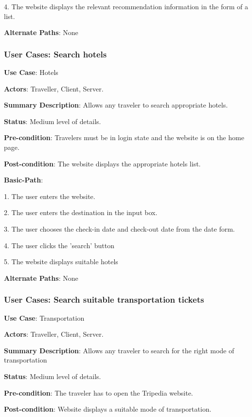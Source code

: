 \documentclass[conference]{IEEEtran}
\begin{document}
4. The website displays the relevant recommendation information in the form of a list.

\textbf{Alternate Paths}:  None

\subsubsection{User Cases: Search hotels}

\textbf{ }

\textbf{Use Case}: Hotels

\textbf{Actors}: Traveller, Client, Server.

\textbf{Summary Description}: Allows any traveler to search appropriate hotels.

\textbf{Status}: Medium level of details.

\textbf{Pre-condition}: Travelers must be in login state and the website is on the home page.

\textbf{Post-condition}: The website displays the appropriate hotels list.

\textbf{Basic-Path}:

1. The user enters the website.

2. The user enters the destination in the input box.

3. The user chooses the check-in date and check-out date from the date form.

4. The user clicks the 'search' button

5. The website displays suitable hotels

\textbf{Alternate Paths}: None

\subsubsection{User Cases: Search suitable transportation tickets}

\textbf{ }

\textbf{Use Case}: Transportation

\textbf{Actors}: Traveller, Client, Server.

\textbf{Summary Description}: Allows any traveler to search for the right mode of transportation

\textbf{Status}: Medium level of details.

\textbf{Pre-condition}: The traveler has to open the Tripedia website.

\textbf{Post-condition}: Website displays a suitable mode of transportation.
\end{document}
